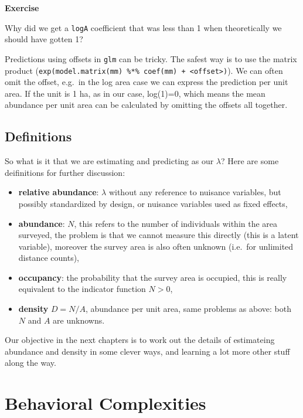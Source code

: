 \documentclass[12pt,]{book}
\providecommand{\tightlist}{%
  \setlength{\itemsep}{0pt}\setlength{\parskip}{0pt}}
\let\BeginKnitrBlock\begin \let\EndKnitrBlock\end
\begin{document}
\BeginKnitrBlock{rmdexercise}
\textbf{Exercise}

Why did we get a \texttt{logA} coefficient that was less than 1 when theoretically we should have gotten 1?
\EndKnitrBlock{rmdexercise}

Predictions using offsets in \texttt{glm} can be tricky.
The safest way is to use the matrix product
(\texttt{exp(model.matrix(mm)\ \%*\%\ coef(mm)\ +\ \textless{}offset\textgreater{})}).
We can often omit the offset, e.g.~in the log area case
we can express the prediction per unit area.
If the unit is 1 ha, as in our case, log(1)=0, which means
the mean abundance per unit area can be calculated by
omitting the offsets all together.

\hypertarget{definitions}{%
\section{Definitions}\label{definitions}}

So what is it that we are estimating and predicting as our \(\lambda\)?
Here are some deifinitions for further discussion:

\begin{itemize}
\tightlist
\item
  \textbf{relative abundance}: \(\lambda\) without any reference to nuisance variables, but possibly standardized by design, or nuisance variables used as fixed effects,
\item
  \textbf{abundance}: \(N\), this refers to the number of individuals within the area surveyed, the problem is that we cannot measure this directly (this is a latent variable), moreover the survey area is also often unknown (i.e.~for unlimited distance counts),
\item
  \textbf{occupancy}: the probability that the survey area is occupied, this is really equivalent to the indicator function \(N>0\),
\item
  \textbf{density} \(D = N/A\), abundance per unit area, same problems as above: both \(N\) and \(A\) are unknowns.
\end{itemize}

Our objective in the next chapters is to work out the details of
estimateing abundance and density in some clever ways, and learning
a lot more other stuff along the way.

\hypertarget{behavior}{%
\chapter{Behavioral Complexities}\label{behavior}}
\end{document}

